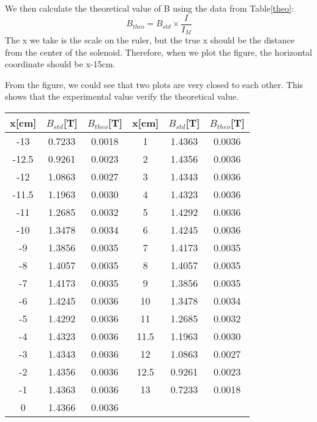 \documentclass[12pt,a4paper]{article}
\begin{document}
We then calculate the theoretical value of B using the data from Table\ref{theo}:
$$B_{theo}=B_{std}\times \frac{I}{I_M}$$
The x we take is the scale on the ruler, but the true x should be the distance from the center of the solenoid. Therefore, when we plot the figure, the horizontal coordinate should be x-15cm.\par 
From the figure, we could see that two plots are very closed to each other. This shows that the experimental value verify the theoretical value.

\begin{table}[H]
    \centering
    \begin{tabular}{|c|c|c|c|c|c|}
    \hline
    x{[}cm{]} & $B_{std}$[T]   & $B_{theo}${[}T{]} & x{[}cm{]} &   $B_{std}$[T]& $B_{theo}${[}T{]} \\ \hline
    -13& 0.7233 & 0.0018  & 1  & 1.4363 & 0.0036  \\ \hline
    -12.5& 0.9261 & 0.0023  & 2  & 1.4356 & 0.0036  \\ \hline
    -12& 1.0863 & 0.0027  & 3  & 1.4343 & 0.0036  \\ \hline
    -11.5& 1.1963 & 0.0030   & 4  & 1.4323 & 0.0036  \\ \hline
    -11& 1.2685 & 0.0032  & 5  & 1.4292 & 0.0036  \\ \hline
    -10& 1.3478 & 0.0034  & 6  & 1.4245 & 0.0036  \\ \hline
    -9 & 1.3856 & 0.0035  & 7  & 1.4173 & 0.0035  \\ \hline
    -8 & 1.4057 & 0.0035  & 8  & 1.4057 & 0.0035  \\ \hline
    -7 & 1.4173 & 0.0035  & 9  & 1.3856 & 0.0035  \\ \hline
    -6 & 1.4245 & 0.0036  & 10 & 1.3478 & 0.0034  \\ \hline
    -5 & 1.4292 & 0.0036  & 11 & 1.2685 & 0.0032  \\ \hline
    -4 & 1.4323 & 0.0036  & 11.5 & 1.1963 & 0.0030   \\ \hline
    -3 & 1.4343 & 0.0036  & 12 & 1.0863 & 0.0027  \\ \hline
    -2 & 1.4356 & 0.0036  & 12.5 & 0.9261 & 0.0023  \\ \hline
    -1 & 1.4363 & 0.0036  & 13 & 0.7233 & 0.0018  \\ \hline
    0  & 1.4366 & 0.0036  &    & &  \\ \hline
    \end{tabular}
\end{table}
\end{document}
